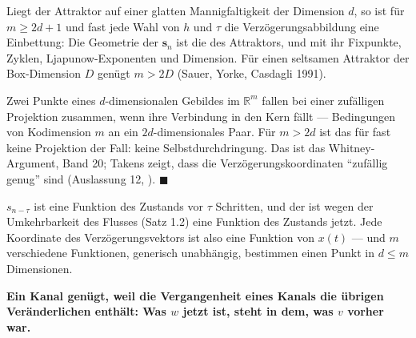 \begin{merksatz}
Liegt der Attraktor auf einer glatten Mannigfaltigkeit der Dimension $d$, so ist für $m \ge 2d + 1$ und fast jede Wahl von $h$ und $\tau$ die Verzögerungsabbildung eine Einbettung: Die Geometrie der $\mathbf s_n$ ist die des Attraktors, und mit ihr Fixpunkte, Zyklen, Ljapunow-Exponenten und Dimension. Für einen seltsamen Attraktor der Box-Dimension $D$ genügt $m > 2D$ (Sauer, Yorke, Casdagli 1991).

Zwei Punkte eines $d$-dimensionalen Gebildes im $\mathbb R^{m}$ fallen bei einer zufälligen Projektion zusammen, wenn ihre Verbindung in den Kern fällt --- Bedingungen von Kodimension $m$ an ein $2d$-dimensionales Paar. Für $m > 2d$ ist das für fast keine Projektion der Fall: keine Selbstdurchdringung. Das ist das Whitney-Argument, Band 20; Takens zeigt, dass die Verzögerungskoordinaten \enquote{zufällig genug} sind (Auslassung 12, ). $\blacksquare$

$s_{n-\tau}$ ist eine Funktion des Zustands vor $\tau$ Schritten, und der ist wegen der Umkehrbarkeit des Flusses (Satz 1.2) eine Funktion des Zustands jetzt. Jede Koordinate des Verzögerungsvektors ist also eine Funktion von $x(t)$ --- und $m$ verschiedene Funktionen, generisch unabhängig, bestimmen einen Punkt in $d \le m$ Dimensionen.

\begin{center}
\begin{minipage}{0.9\textwidth}
\textbf{Ein Kanal genügt, weil die Vergangenheit eines Kanals die übrigen Veränderlichen enthält: Was $w$ jetzt ist, steht in dem, was $v$ vorher war.}
\end{minipage}
\end{center}

\begin{center}
\begin{minipage}{0.88\textwidth}
\end{minipage}
\end{center}
\end{merksatz}

